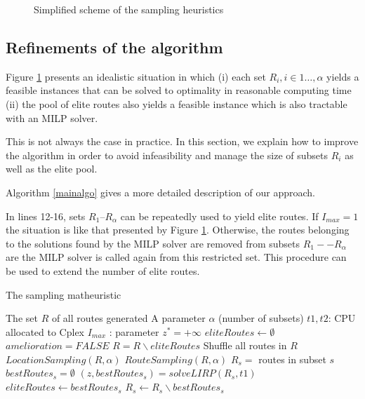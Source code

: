 \documentclass[a4paper,10pt]{article}
\begin{document}
\begin{linenumbers}
\begin{figure}[htbp]
\begin{tikzpicture}[scale=0.8, auto,swap]
	\end{tikzpicture}
	\caption{Simplified scheme of the sampling heuristics}
	\label{fig:algo1}
\end{figure}



\subsection{Refinements of the algorithm} 

Figure \ref{fig:algo1} presents an idealistic situation in which 
(i) each set $R_i, i \in 1\dots, \alpha$ yields a feasible instances that can be solved to optimality in reasonable computing time
(ii) the pool of elite routes also yields a feasible instance which is also tractable with an MILP solver. 

This is not always the case in practice. In this section, we explain how to improve the algorithm in order to avoid infeasibility and manage the size of subsets $R_i$ as well as the elite pool. 


Algorithm \ref{mainalgo} gives a more detailed description of our approach. 


In lines 12-16, sets $R_1$--$R_\alpha$ can be repeatedly used to yield elite routes. If $I_{max}=1$ the situation is like that presented by Figure \ref{fig:algo1}. Otherwise, the routes belonging to the solutions found by the MILP solver are removed from subsets $R_1 -- R_\alpha $ are the MILP solver is called again from this restricted set. This procedure can be used to extend the number of elite routes. 




\begin{algorithm}
	\caption{The sampling matheuristic}
	\label{mainalgo}
	\begin{algorithmic}[1]
		\REQUIRE  The set $R$ of all routes generated
		\REQUIRE A parameter $\alpha$ (number of subsets)
		\REQUIRE $t1, t2$: CPU allocated to Cplex
		\REQUIRE $I_{max}$ : parameter
		\STATE $z^*= +\infty$
		\STATE $eliteRoutes \leftarrow \emptyset$
		\REPEAT
			\STATE $amelioration = FALSE$
			\STATE $R =  R \backslash eliteRoutes$
			\STATE Shuffle all routes in $R$
			\STATE $LocationSampling(R,\alpha)$ 
			\STATE $RouteSampling(R,\alpha)$	
				\STATE $R_s = $ routes in subset $s$
				\STATE $bestRoutes_s = \emptyset$
					\STATE $(z,bestRoutes_s) = solveLIRP(R_s,t1)$ 
					\STATE $eliteRoutes \leftarrow bestRoutes_s$
					\STATE $R_s \leftarrow R_s \backslash bestRoutes_s$
					

\end{algorithmic}
\end{algorithm}
\end{linenumbers}
\end{document}
